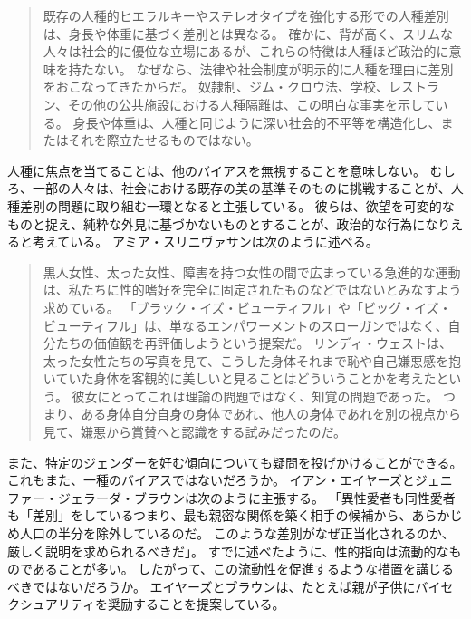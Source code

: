 \documentclass[paper=a4,book,openany]{jlreq} \usepackage{mystyle}
\begin{document}
\begin{quote}
  既存の人種的ヒエラルキーやステレオタイプを強化する形での人種差別は、身長や体重に基づく差別とは異なる。
確かに、背が高く、スリムな人々は社会的に優位な立場にあるが、これらの特徴は人種ほど政治的に意味を持たない。
なぜなら、法律や社会制度が明示的に人種を理由に差別をおこなってきたからだ。
奴隷制、ジム・クロウ法、学校、レストラン、その他の公共施設における人種隔離は、この明白な事実を示している。
身長や体重は、人種と同じように深い社会的不平等を構造化し、またはそれを際立たせるものではない。
\citep[p. 1004]{bedi15:_sexual_racis}

\end{quote}

人種に焦点を当てることは、他のバイアスを無視することを意味しない。
むしろ、一部の人々は、社会における既存の美の基準そのものに挑戦することが、人種差別の問題に取り組む一環となると主張している。
彼らは、欲望を可変的なものと捉え、純粋な外見に基づかないものとすることが、政治的な行為になりえると考えている。
アミア・スリニヴァサンは次のように述べる。

\begin{quote}
黒人女性、太った女性、障害を持つ女性の間で広まっている急進的な運動は、私たちに性的嗜好を完全に固定されたものなどではないとみなすよう求めている。
「ブラック・イズ・ビューティフル」や「ビッグ・イズ・ビューティフル」は、単なるエンパワーメントのスローガンではなく、自分たちの価値観を再評価しようという提案だ。
リンディ・ウェストは、太った女性たちの写真を見て、こうした身体{\DDASH}それまで恥や自己嫌悪感を抱いていた身体{\DDASH}を客観的に美しいと見ることはどういうことかを考えたという。
彼女にとってこれは理論の問題ではなく、知覚の問題であった。
つまり、ある身体{\DDASH}自分自身の身体であれ、他人の身体であれ{\DDASH}を別の視点から見て、嫌悪から賞賛へと認識をする試みだったのだ。
\citep{srinivasan18:_does_anyon_have_right_sex}
\end{quote}

また、特定のジェンダーを好む傾向についても疑問を投げかけることができる。
これもまた、一種のバイアスではないだろうか。
イアン・エイヤーズとジェニファー・ジェラーダ・ブラウンは次のように主張する。
「異性愛者も同性愛者も「差別」をしている{\DDASH}つまり、最も親密な関係を築く相手の候補から、あらかじめ人口の半分を除外しているのだ。
このような差別がなぜ正当化されるのか、厳しく説明を求められるべきだ」\citep[p. 31]{ayres05:_straig}。
すでに述べたように、性的指向は流動的なものであることが多い。
したがって、この流動性を促進するような措置を講じるべきではないだろうか。
エイヤーズとブラウンは、たとえば親が子供にバイセクシュアリティを奨励することを提案している。
\end{document}
